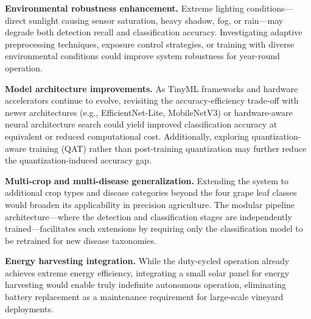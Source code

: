 \textbf{Environmental robustness enhancement.} Extreme lighting conditions---direct sunlight causing sensor saturation, heavy shadow, fog, or rain---may degrade both detection recall and classification accuracy. Investigating adaptive preprocessing techniques, exposure control strategies, or training with diverse environmental conditions could improve system robustness for year-round operation.

\textbf{Model architecture improvements.} As TinyML frameworks and hardware accelerators continue to evolve, revisiting the accuracy-efficiency trade-off with newer architectures (e.g., EfficientNet-Lite, MobileNetV3) or hardware-aware neural architecture search could yield improved classification accuracy at equivalent or reduced computational cost. Additionally, exploring quantization-aware training (QAT) rather than post-training quantization may further reduce the quantization-induced accuracy gap.

\textbf{Multi-crop and multi-disease generalization.} Extending the system to additional crop types and disease categories beyond the four grape leaf classes would broaden its applicability in precision agriculture. The modular pipeline architecture---where the detection and classification stages are independently trained---facilitates such extensions by requiring only the classification model to be retrained for new disease taxonomies.

\textbf{Energy harvesting integration.} While the duty-cycled operation already achieves extreme energy efficiency, integrating a small solar panel for energy harvesting would enable truly indefinite autonomous operation, eliminating battery replacement as a maintenance requirement for large-scale vineyard deployments.

